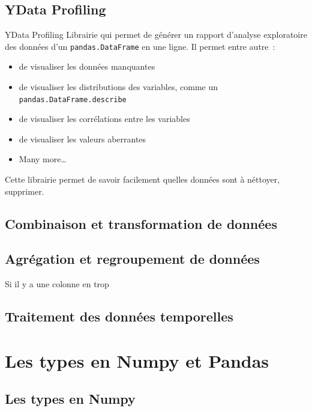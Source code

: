 \documentclass{beamer}
\begin{document}
    \subsection{YData Profiling}
    \begin{frame}{YData Profiling}
        Librairie qui permet de générer un rapport d'analyse exploratoire des données d'un \lstinline{pandas.DataFrame} en une ligne.
        \bigbreak
        Il permet entre autre~:
        \begin{itemize}
            \item de visualiser les données manquantes
            \item de visualiser les distributions des variables, comme un \lstinline{pandas.DataFrame.describe}
            \item de visualiser les corrélations entre les variables
            \item de visualiser les valeurs aberrantes
            \item Many more\ldots{}
        \end{itemize}
        Cette librairie permet de savoir facilement quelles données sont à néttoyer, supprimer.
    \end{frame}

    \subsection{Combinaison et transformation de données}

    \subsection{Agrégation et regroupement de données}

    \begin{frame}
        Si il y a une colonne en trop
    \end{frame}

    \subsection{Traitement des données temporelles}


    \section{Les types en Numpy et Pandas}

    \subsection{Les types en Numpy}\label{numpy-typing}
\end{document}
